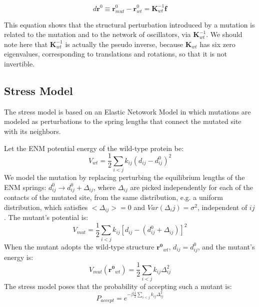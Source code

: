 \documentclass{article}
\begin{document}
\begin{multicols}{2}
{\begin{equation}
d\mathbf{r}^{0} \equiv  \mathbf{r}^{0}_{mut} - \mathbf{r}^{0}_{wt} = \mathbf{K}^{-1}_{wt}\mathbf{f}
\end{equation}

This equation shows that the structural perturbation introduced by a mutation is related to the mutation and to the network of oscillators, via $\mathbf{K}^{-1}_{wt}$. We should note here that $\mathbf{K}^{-1}_{wt}$ is actually the pseudo inverse, because $\mathbf{K}_{wt}$ has six zero eigenvalues, corresponding to translations and rotations, so that it is not invertible.

\subsection*{Stress Model}
The stress model is based on an Elastic Netowork Model in which mutations are modeled as perturbations to the spring lengths that connect the mutated site with its neighbors.

Let the ENM potential energy of the wild-type protein be:
\begin{equation} \label{eq:Vwt}
V_{wt} = \frac{1}{2} \sum_{i<j} k_{ij} (d_{ij}-d^0_{ij})^2
\end{equation}
We model the mutation by replacing perturbing the equilibrium lengths of the ENM springs: $d^0_{ij} \to d^0_{ij} + \Delta_{ij}$, where $\Delta_{ij}$ are picked independently for each of the contacts of the mutated site, from the same distribution, e.g. a uniform distribution, which satisfies $<\Delta_{ij}> = 0$ and $Var(\Delta_ij) = \sigma^2$, independent of $ij$. The mutant's potential is:
\begin{equation} \label{eq:Vmut}
V_{mut} = \frac{1}{2} \sum_{i<j} k_{ij} [d_{ij}-(d^0_{ij}+\Delta_{ij})]^2
\end{equation}
When the mutant adopts the wild-type structure $\mathbf{r^0}_{wt}$, $d_{ij} = d_{ij}^0$, and the mutant's energy is:
\begin{equation} \label{eq:Vmut0}
V_{mut}(\mathbf{r^0}_{wt}) = \frac{1}{2} \sum_{i<j} k_{ij} \Delta_{ij}^2
\end{equation}
The stress model poses that the probability of accepting such a mutant is:
\begin{equation} \label{eq:Paccept}
P_{accept} = e^{-\beta \frac{1}{2} \sum_{i<j} k_{ij} \Delta_{ij}^2}
\end{equation}

}
\end{multicols}
\end{document}
